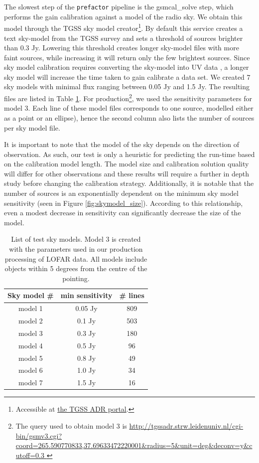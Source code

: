The slowest step of the \texttt{prefactor} pipeline is the gsmcal\_solve step, which performs the gain calibration against a model of the radio sky. We obtain this model through the TGSS sky model creator\footnote{Accessible at \href{http://tgssadr.strw.leidenuniv.nl/doku.php}{the TGSS ADR portal}.}. By default this service creates a text sky-model from the TGSS survey \citep{tgssadr} and sets a threshold of sources brighter than 0.3 Jy. 
Lowering this threshold creates longer sky-model files with more faint sources, while increasing it will return only the few brightest sources. Since sky model calibration requires converting the sky-model into UV data \citep{dppp}, a longer sky model will increase the time taken to gain calibrate a data set. We created 7 sky models with minimal flux ranging between 0.05 Jy and 1.5 Jy. The resulting files are listed in Table \ref{table:skymodels}. 
For production\footnote{The query used to obtain model 3 is \url{http://tgssadr.strw.leidenuniv.nl/cgi-bin/gsmv3.cgi?coord=265.590770833,37.69633472220001\&radius=5\&unit=deg\&deconv=y\&cutoff=0.3 }}, we used the sensitivity parameters for model 3. Each line of these model files corresponds to one source, modelled either as a point or an ellipse), hence the second column also lists the number of sources per sky model file.

It is important to note that the model of the sky depends on the direction of observation. As such, our test is only a heuristic for predicting the run-time based on the calibration model length. The model size and calibration solution quality will differ for other observations and these results will require a further in depth study before changing the calibration strategy. Additionally, it is notable that the number of sources is an exponentially dependent on the minimum sky model sensitivity (seen in Figure \ref{fig:skymodel_size}). According to this relationship, even a modest decrease in sensitivity can significantly decrease the size of the model.

\begin{table}[!ht]
\centering
\begin{tabular}{||c| c | c||} 
 \hline
 Sky model \# & min sensitivity & \# lines  \\ [0.5ex] 
 \hline
 model 1 & 0.05 Jy & 809    \\ 
 model 2 & 0.1 Jy & 503   \\
 \rowcolor{Gray}
  \hline
 model 3 & 0.3 Jy & 180   \\
  \hline
 model 4 & 0.5 Jy & 96  \\
 model 5 & 0.8 Jy & 49   \\ 
 model 6 & 1.0 Jy & 34   \\
 model 7 & 1.5 Jy & 16   \\[1ex] 
 \hline
\end{tabular}
\caption{List of test sky models. Model 3 is created with the parameters used in our production processing of LOFAR data. All models include objects within 5 degrees from the centre of the pointing.  }
\label{table:skymodels}
\end{table}


